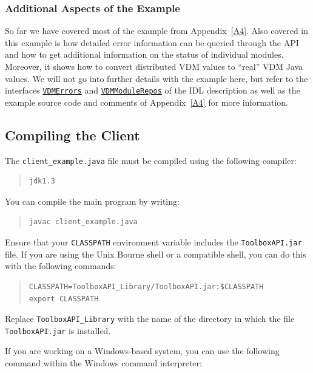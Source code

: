 \documentclass[\pformat,12pt]{article}
\newcommand{\VDMErrors}{\hyperlink{interface.VDMErrors}{VDMErrors}}
\newcommand{\VDMModuleRepos}{\hyperlink{interface.VDMModuleRepos}{VDMModuleRepos}}
\begin{document}
\subsubsection{Additional Aspects of the Example}

So far we have covered most of the example from Appendix~\ref{A4}. Also
covered in this example is how detailed error information can be
queried through the API and how to get additional information on the
status of individual modules. Moreover, it shows how to convert
distributed VDM values to ``real'' VDM Java values. We will not go
into further details with 
the example here, but refer to the interfaces {\tt \VDMErrors} and
{\tt \VDMModuleRepos} of the IDL description as well as the example source
code and comments of Appendix~\ref{A4} for more information.

\subsection{Compiling the Client}

The  {\tt client\_example.java} file must be compiled using
the following compiler:

\begin{quote}
\begin{verbatim}
jdk1.3
\end{verbatim}
\end{quote}

You can compile the main program by writing:

\begin{quote}
\begin{verbatim}
javac client_example.java
\end{verbatim}  
\end{quote}

Ensure that your {\tt CLASSPATH} environment variable includes the
{\tt ToolboxAPI.jar} file. If you are using the Unix Bourne shell or a
compatible shell, you can do this with the following commands:

\begin{quote}
\begin{verbatim}
CLASSPATH=ToolboxAPI_Library/ToolboxAPI.jar:$CLASSPATH
export CLASSPATH
\end{verbatim}  %
\end{quote}

Replace {\tt ToolboxAPI\_Library} with the name of the directory in
which the file {\tt ToolboxAPI.jar} is installed. 

If you are working on a Windows-based system, you can use the
following command within the Windows command interpreter: 
\end{document}
